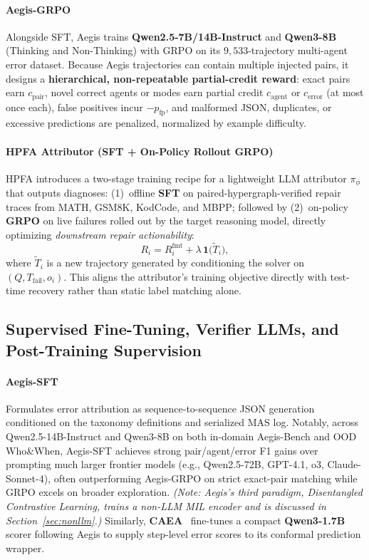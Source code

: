 \paragraph{Aegis-GRPO~\citep{kong2026aegis}}
Alongside SFT, Aegis trains \textbf{Qwen2.5-7B/14B-Instruct} and \textbf{Qwen3-8B} (Thinking and Non-Thinking) with GRPO on its $9{,}533$-trajectory multi-agent error dataset. Because Aegis trajectories can contain multiple injected  pairs, it designs a \textbf{hierarchical, non-repeatable partial-credit reward}: exact  pairs earn $c_{\text{pair}}$, novel correct agents or modes earn partial credit $c_{\text{agent}}$ or $c_{\text{error}}$ (at most once each), false positives incur $-p_{\text{fp}}$, and malformed JSON, duplicates, or excessive predictions are penalized, normalized by example difficulty.

\paragraph{HPFA Attributor (SFT + On-Policy Rollout GRPO)~\citep{zhu2026hpfa}}
HPFA introduces a two-stage training recipe for a lightweight LLM attributor $\pi_\phi$ that outputs  diagnoses: (1)~offline \textbf{SFT} on paired-hypergraph-verified repair traces from MATH, GSM8K, KodCode, and MBPP; followed by (2)~on-policy \textbf{GRPO} on live failures rolled out by the target reasoning model, directly optimizing \emph{downstream repair actionability}:
\begin{equation}
  R_i = R_i^{\text{fmt}} + \lambda\, \mathbf{1}\!\big(\tilde{T}_i\big),
\end{equation}
where $\tilde{T}_i$ is a new trajectory generated by conditioning the solver on $(Q, T_{\text{fail}}, o_i)$. This aligns the attributor's training objective directly with test-time recovery rather than static label matching alone.

\subsection{Supervised Fine-Tuning, Verifier LLMs, and Post-Training Supervision}
\paragraph{Aegis-SFT~\citep{kong2026aegis}}
Formulates error attribution as sequence-to-sequence JSON generation conditioned on the taxonomy definitions and serialized MAS log. Notably, across Qwen2.5-14B-Instruct and Qwen3-8B on both in-domain Aegis-Bench and OOD Who\&When, Aegis-SFT achieves strong pair/agent/error F1 gains over prompting much larger frontier models (e.g., Qwen2.5-72B, GPT-4.1, o3, Claude-Sonnet-4), often outperforming Aegis-GRPO on strict exact-pair matching while GRPO excels on broader exploration. \emph{(Note: Aegis's third paradigm, Disentangled Contrastive Learning, trains a non-LLM MIL encoder and is discussed in Section~\ref{sec:nonllm}.)} Similarly, \textbf{CAEA}~\citep{feng2026caea} fine-tunes a compact \textbf{Qwen3-1.7B} scorer following Aegis to supply step-level error scores to its conformal prediction wrapper.

